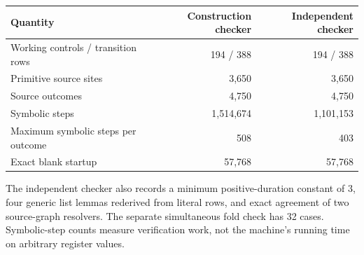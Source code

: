 \begin{center}
\begin{tabular}{@{}lrr@{}}
\toprule Quantity & Construction checker & Independent checker\\\midrule
Working controls / transition rows &194 / 388&194 / 388\\
Primitive source sites &3,650&3,650\\
Source outcomes &4,750&4,750\\
Symbolic steps &1,514,674&1,101,153\\
Maximum symbolic steps per outcome &508&403\\
Exact blank startup &57,768&57,768\\
\bottomrule\end{tabular}\end{center}
The independent checker also records a minimum positive-duration constant of 3, four generic list lemmas rederived from literal rows, and exact agreement of two source-graph resolvers. The separate simultaneous fold check has 32 cases. Symbolic-step counts measure verification work, not the machine's running time on arbitrary register values.
